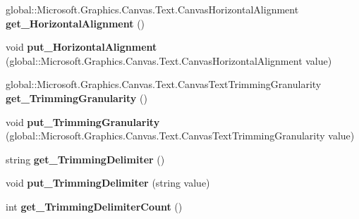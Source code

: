 \begin{DoxyCompactItemize}
global\+::\+Microsoft.\+Graphics.\+Canvas.\+Text.\+Canvas\+Horizontal\+Alignment {\bfseries get\+\_\+\+Horizontal\+Alignment} ()
\item 
\mbox{\label{interface_microsoft_1_1_graphics_1_1_canvas_1_1_text_1_1_i_canvas_text_layout_a1ed48a95cc077705f220f440b7d0ec96}} 
void {\bfseries put\+\_\+\+Horizontal\+Alignment} (global\+::\+Microsoft.\+Graphics.\+Canvas.\+Text.\+Canvas\+Horizontal\+Alignment value)
\item 
\mbox{\label{interface_microsoft_1_1_graphics_1_1_canvas_1_1_text_1_1_i_canvas_text_layout_a0e97f065a5957e5937f383d4e8676d1f}} 
global\+::\+Microsoft.\+Graphics.\+Canvas.\+Text.\+Canvas\+Text\+Trimming\+Granularity {\bfseries get\+\_\+\+Trimming\+Granularity} ()
\item 
\mbox{\label{interface_microsoft_1_1_graphics_1_1_canvas_1_1_text_1_1_i_canvas_text_layout_a6159ff2880908ea328720398d78bb388}} 
void {\bfseries put\+\_\+\+Trimming\+Granularity} (global\+::\+Microsoft.\+Graphics.\+Canvas.\+Text.\+Canvas\+Text\+Trimming\+Granularity value)
\item 
\mbox{\label{interface_microsoft_1_1_graphics_1_1_canvas_1_1_text_1_1_i_canvas_text_layout_ae248cefb5cdb08879e9a5324630e97d6}} 
string {\bfseries get\+\_\+\+Trimming\+Delimiter} ()
\item 
\mbox{\label{interface_microsoft_1_1_graphics_1_1_canvas_1_1_text_1_1_i_canvas_text_layout_a98a50566a034e585369dc4b5b61fca2b}} 
void {\bfseries put\+\_\+\+Trimming\+Delimiter} (string value)
\item 
\mbox{\label{interface_microsoft_1_1_graphics_1_1_canvas_1_1_text_1_1_i_canvas_text_layout_a4e5e0c2a157d8f5e600e2dd3ac83d47a}} 
int {\bfseries get\+\_\+\+Trimming\+Delimiter\+Count} ()
\item 
\mbox{\label{interface_microsoft_1_1_graphics_1_1_canvas_1_1_text_1_1_i_canvas_text_layout_a7f70f45b494c4711ae59c8639f245a54}} 

\end{DoxyCompactItemize}
